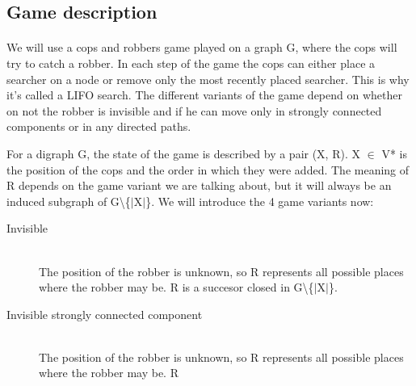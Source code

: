 \subsection{Game description}
\paragraph{}
We will use a cops and robbers game played on a graph G, where the cops will try to catch a robber. In each step of the game the cops can either place a searcher on a node or remove only the most recently placed searcher. This is why it's called a LIFO search. The different variants of the game depend on whether on not the robber is invisible and if he can move only in strongly connected components or in any directed paths.

For a digraph G, the state of the game is described by a pair (X, R). X $\in$ V* is the position of the cops and the order in which they were added. The meaning of R depends on the game variant we are talking about, but it will always be an induced subgraph of G\textbackslash \{$|$X$|$\}. We will introduce the 4 game variants now:
\begin{description}
\item[Invisible] \hfill \\
The position of the robber is unknown, so R represents all possible places where the robber may be. R is a succesor closed in G\textbackslash \{$|$X$|$\}.
\item[Invisible strongly connected component] \hfill \\
The position of the robber is unknown, so R represents all possible places where the robber may be. R
\end{description}